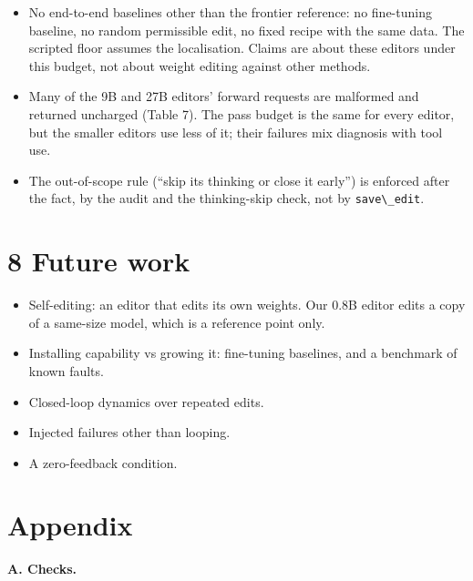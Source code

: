\documentclass[
  10pt,
]{article}
\newcommand{\passthrough}[1]{#1}
\providecommand{\tightlist}{%
  \setlength{\itemsep}{0pt}\setlength{\parskip}{0pt}}
\begin{document}
\begin{itemize}
  recorded activations, which our rule (b) forbids, and two of them
  selected the neurons of its submitted edit.
\item
  No end-to-end baselines other than the frontier reference: no
  fine-tuning baseline, no random permissible edit, no fixed recipe with
  the same data. The scripted floor assumes the localisation. Claims are
  about these editors under this budget, not about weight editing
  against other methods.
\item
  Many of the 9B and 27B editors' forward requests are malformed and
  returned uncharged (Table 7). The pass budget is the same for every
  editor, but the smaller editors use less of it; their failures mix
  diagnosis with tool use.
\item
  The out-of-scope rule (``skip its thinking or close it early'') is
  enforced after the fact, by the audit and the thinking-skip check, not
  by \passthrough{\lstinline!save\_edit!}.
\end{itemize}

\section{8 Future work}\label{future-work}

\begin{itemize}
\tightlist
\item
  Self-editing: an editor that edits its own weights. Our 0.8B editor
  edits a copy of a same-size model, which is a reference point only.
\item
  Installing capability vs growing it: fine-tuning baselines, and a
  benchmark of known faults.
\item
  Closed-loop dynamics over repeated edits.
\item
  Injected failures other than looping.
\item
  A zero-feedback condition.
\end{itemize}

\section{Appendix}\label{appendix}

\textbf{A. Checks.}
\end{document}
